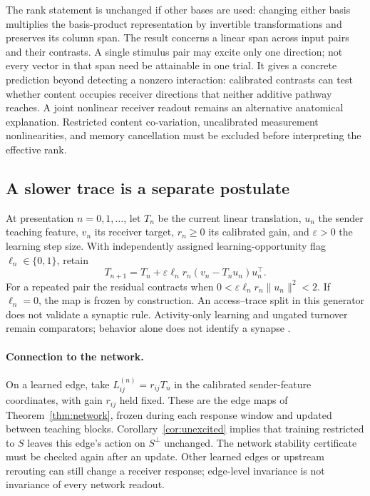 \documentclass[submission,nolinenumbers]{esj}
\begin{document}
The rank statement is unchanged if other bases are used: changing either basis multiplies the basis-product representation by invertible transformations and preserves its column span. The result concerns a linear span across input pairs and their contrasts. A single stimulus pair may excite only one direction; not every vector in that span need be attainable in one trial. It gives a concrete prediction beyond detecting a nonzero interaction: calibrated contrasts can test whether content occupies receiver directions that neither additive pathway reaches. A joint nonlinear receiver readout remains an alternative anatomical explanation. Restricted content co-variation, uncalibrated measurement nonlinearities, and memory cancellation must be excluded before interpreting the effective rank.



\subsection{A slower trace is a separate postulate}\label{sec:plastic}
At presentation $n=0,1,\ldots$, let $T_n$ be the current linear translation, $u_n$ the sender teaching feature, $v_n$ its receiver target, $r_n\ge0$ its calibrated gain, and $\varepsilon>0$ the learning step size. With independently assigned learning-opportunity flag $\ell_n\in\{0,1\}$, retain
\begin{equation}
T_{n+1}=T_n+\varepsilon\ell_n r_n(v_n-T_nu_n)u_n^\top.\label{eq:plastic}
\end{equation}
For a repeated pair the residual contracts when $0<\varepsilon\ell_nr_n\|u_n\|^2<2$. If $\ell_n=0$, the map is frozen by construction. An access--trace split in this generator does not validate a synaptic rule. Activity-only learning and ungated turnover remain comparators; behavior alone does not identify a synapse \citep{dudai2015}.

\paragraph{Connection to the network.} On a learned edge, take $L_{ij}^{(n)}=r_{ij}T_n$ in the calibrated sender-feature coordinates, with gain $r_{ij}$ held fixed. These are the edge maps of Theorem~\ref{thm:network}, frozen during each response window and updated between teaching blocks. Corollary~\ref{cor:unexcited} implies that training restricted to $S$ leaves this edge's action on $S^\perp$ unchanged. The network stability certificate must be checked again after an update. Other learned edges or upstream rerouting can still change a receiver response; edge-level invariance is not invariance of every network readout.
\end{document}
